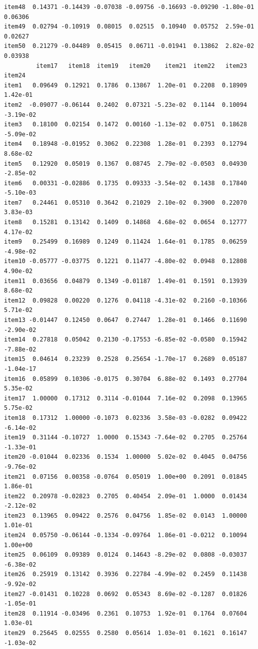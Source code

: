 \documentclass[
  a4paper,
]{ltjsbook}
\begin{document}
\begin{verbatim}
item48  0.14371 -0.14439 -0.07038 -0.09756 -0.16693 -0.09290 -1.80e-01  0.06306
item49  0.02794 -0.10919  0.08015  0.02515  0.10940  0.05752  2.59e-01  0.02627
item50  0.21279 -0.04489  0.05415  0.06711 -0.01941  0.13862  2.82e-02  0.03938
         item17   item18  item19   item20    item21  item22   item23    item24
item1   0.09649  0.12921  0.1786  0.13867  1.20e-01  0.2208  0.18909  1.42e-01
item2  -0.09077 -0.06144  0.2402  0.07321 -5.23e-02  0.1144  0.10094 -3.19e-02
item3   0.18100  0.02154  0.1472  0.00160 -1.13e-02  0.0751  0.18628 -5.09e-02
item4   0.18948 -0.01952  0.3062  0.22308  1.28e-01  0.2393  0.12794  8.68e-02
item5   0.12920  0.05019  0.1367  0.08745  2.79e-02 -0.0503  0.04930 -2.85e-02
item6   0.00331 -0.02886  0.1735  0.09333 -3.54e-02  0.1438  0.17840 -5.10e-03
item7   0.24461  0.05310  0.3642  0.21029  2.10e-02  0.3900  0.22070  3.83e-03
item8   0.15281  0.13142  0.1409  0.14868  4.68e-02  0.0654  0.12777  4.17e-02
item9   0.25499  0.16989  0.1249  0.11424  1.64e-01  0.1785  0.06259 -4.98e-02
item10 -0.05777 -0.03775  0.1221  0.11477 -4.80e-02  0.0948  0.12808  4.90e-02
item11  0.03656  0.04879  0.1349 -0.01187  1.49e-01  0.1591  0.13939  8.68e-02
item12  0.09828  0.00220  0.1276  0.04118 -4.31e-02  0.2160 -0.10366  5.71e-02
item13 -0.01447  0.12450  0.0647  0.27447  1.28e-01  0.1466  0.11690 -2.90e-02
item14  0.27818  0.05042  0.2130 -0.17553 -6.85e-02 -0.0580  0.15942 -7.88e-02
item15  0.04614  0.23239  0.2528  0.25654 -1.70e-17  0.2689  0.05187 -1.04e-17
item16  0.05899  0.10306 -0.0175  0.30704  6.88e-02  0.1493  0.27704  5.35e-02
item17  1.00000  0.17312  0.3114 -0.01044  7.16e-02  0.2098  0.13965  5.75e-02
item18  0.17312  1.00000 -0.1073  0.02336  3.58e-03 -0.0282  0.09422 -6.14e-02
item19  0.31144 -0.10727  1.0000  0.15343 -7.64e-02  0.2705  0.25764 -1.33e-01
item20 -0.01044  0.02336  0.1534  1.00000  5.02e-02  0.4045  0.04756 -9.76e-02
item21  0.07156  0.00358 -0.0764  0.05019  1.00e+00  0.2091  0.01845  1.86e-01
item22  0.20978 -0.02823  0.2705  0.40454  2.09e-01  1.0000  0.01434 -2.12e-02
item23  0.13965  0.09422  0.2576  0.04756  1.85e-02  0.0143  1.00000  1.01e-01
item24  0.05750 -0.06144 -0.1334 -0.09764  1.86e-01 -0.0212  0.10094  1.00e+00
item25  0.06109  0.09389  0.0124  0.14643 -8.29e-02  0.0808 -0.03037 -6.38e-02
item26  0.25919  0.13142  0.3936  0.22784 -4.99e-02  0.2459  0.11438 -9.92e-02
item27 -0.01431  0.10228  0.0692  0.05343  8.69e-02 -0.1287  0.01826 -1.05e-01
item28  0.11914 -0.03496  0.2361  0.10753  1.92e-01  0.1764  0.07604  1.03e-01
item29  0.25645  0.02555  0.2580  0.05614  1.03e-01  0.1621  0.16147 -1.03e-02

\end{verbatim}
\end{document}
